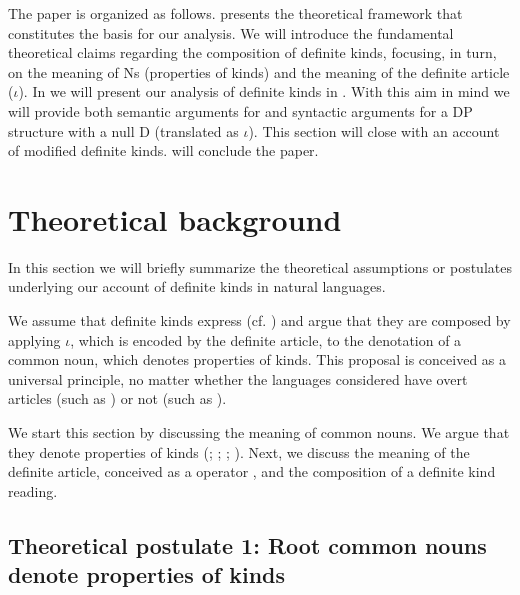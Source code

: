 \documentclass[output=paper
,modfonts
,nonflat]{langsci/langscibook}
\begin{document}
	The paper is organized as follows.   presents the theoretical framework that constitutes the basis for our analysis. We will introduce the fundamental theoretical claims regarding the composition of definite kinds, focusing, in turn, on the meaning of Ns (properties of kinds) and the meaning of the definite article ($\iota$). In  we will present our analysis of definite kinds in . With this aim in mind we will provide both semantic arguments for  and syntactic arguments for a DP structure with a null D (translated as $\iota$). This section will close with an account of modified definite kinds.  will conclude the paper. 
	
	\section{Theoretical background} \label{sec:borik:2}
	
	In this section we will briefly summarize the theoretical assumptions or postulates underlying our account of definite kinds in natural languages.
	
	We assume that definite kinds express  (cf. \citealt{KrifkaEtAlii1995}) and argue that they are composed by applying $\iota$, which is encoded by the definite article, to the denotation of a common noun, which denotes properties of kinds. This proposal is conceived as a universal principle, no matter whether the languages considered have overt articles (such as ) or not (such as ). 
	
	We start this section by discussing the meaning of common nouns. We argue that they denote properties of kinds (\citealt{Espinal2007,Espinal2007a}; \citealt{Dobrovie-Sorin2008}; \citealt{Espinal2010}; \citealt{Espinal2011}). Next, we discuss the meaning of the definite article, conceived as a  operator \citep{Sharvy1980}, and the composition of a definite kind reading. 
	
	\subsection{Theoretical postulate 1: Root common nouns denote properties of kinds}
	
\end{document}
